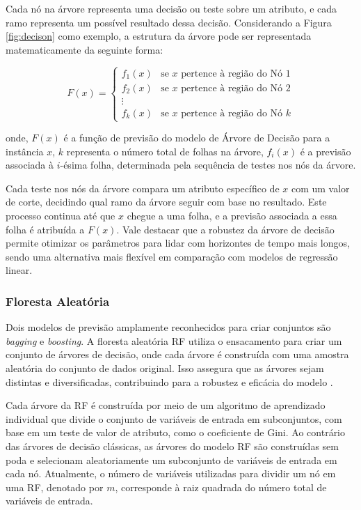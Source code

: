 Cada nó na árvore representa uma decisão ou teste sobre um atributo, e cada ramo representa um possível resultado dessa decisão. Considerando a Figura \ref{fig:decison} como exemplo, a estrutura da árvore pode ser representada matematicamente da seguinte forma:
 
 $$ F(x) = \begin{cases} 
 	f_1(x) & \text{se } x \text{ pertence à região do Nó 1} \\
 	f_2(x) & \text{se } x \text{ pertence à região do Nó 2} \\
 	\vdots \\
 	f_k(x) & \text{se } x \text{ pertence à região do Nó } k 
 \end{cases} $$
 
\noindent onde, $ F(x) $ é a função de previsão do modelo de Árvore de Decisão para a instância $ x $, $ k $ representa o número total de folhas na árvore, $ f_i(x) $ é a previsão associada à $ i $-ésima folha, determinada pela sequência de testes nos nós da árvore.

Cada teste nos nós da árvore compara um atributo específico de $ x $ com um valor de corte, decidindo qual ramo da árvore seguir com base no resultado. Este processo continua até que $ x $ chegue a uma folha, e a previsão associada a essa folha é atribuída a $ F(x) $. Vale destacar que a robustez da árvore de decisão permite otimizar os parâmetros para lidar com horizontes de tempo mais longos, sendo uma alternativa mais flexível em comparação com modelos de regressão linear.
 
 
  
 \subsubsection{Floresta Aleat\'oria} \label{subsubsec:rf}
 
Dois modelos de previsão amplamente reconhecidos para criar conjuntos são \textit{bagging} e \textit{boosting}. A floresta aleatória RF utiliza o ensacamento para criar um conjunto de árvores de decisão, onde cada árvore é construída com uma amostra aleatória do conjunto de dados original. Isso assegura que as árvores sejam distintas e diversificadas, contribuindo para a robustez e eficácia do modelo \cite{SEMAN2023109269}.
 
 Cada árvore da RF é construída por meio de um algoritmo de aprendizado individual que divide o conjunto de variáveis de entrada em subconjuntos, com base em um teste de valor de atributo, como o coeficiente de Gini. Ao contrário das árvores de decisão clássicas, as árvores do modelo RF são construídas sem poda e selecionam aleatoriamente um subconjunto de variáveis de entrada em cada nó. Atualmente, o número de variáveis utilizadas para dividir um nó em uma RF, denotado por $m$, corresponde à raiz quadrada do número total de variáveis de entrada. 
 
